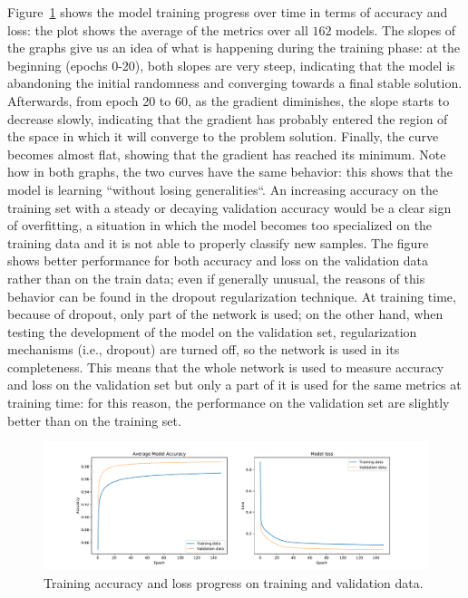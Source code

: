 Figure~\ref{fig:training_avg} shows the model training progress over time in terms of accuracy and loss: the plot shows the average of the metrics over all $162$ models. The slopes of the graphs give us an idea of what is happening during the training phase: at the beginning (epochs 0-20), both slopes are very steep, indicating that the model is abandoning the initial randomness and converging towards a final stable solution. Afterwards, from epoch 20 to 60, as the gradient diminishes, the slope starts to decrease slowly, indicating that the gradient has probably entered the region of the space in which it will converge to the problem solution. Finally, the curve becomes almost flat, showing that the gradient has reached its  minimum. Note how in both graphs, the two curves have the same behavior: this shows that the model is learning ``without losing generalities``. An increasing accuracy on the training set with a steady or decaying validation accuracy would be a clear sign of overfitting, a situation in which the model becomes too specialized on the training data and it is not able to properly classify new samples. 
The figure shows better performance for both accuracy and loss on the validation data rather than on the train data; even if generally unusual, the reasons of this behavior can be found in the dropout regularization technique. At training time, because of dropout, only part of the network is used; on the other hand, when testing the development of the model on the validation set, regularization mechanisms (i.e., dropout) are turned off, so the network is used in its completeness. This means that the whole network is used to measure accuracy and loss on the validation set but only a part of it is used for the same metrics at training time: for this reason, the performance on the validation set are slightly better than on the training set. 


\begin{figure}
\centering
\includegraphics[width=\textwidth]{img/avg_training_metrics}
\caption{Training accuracy and loss progress on training and validation data.}
\label{fig:training_avg}
\end{figure}

